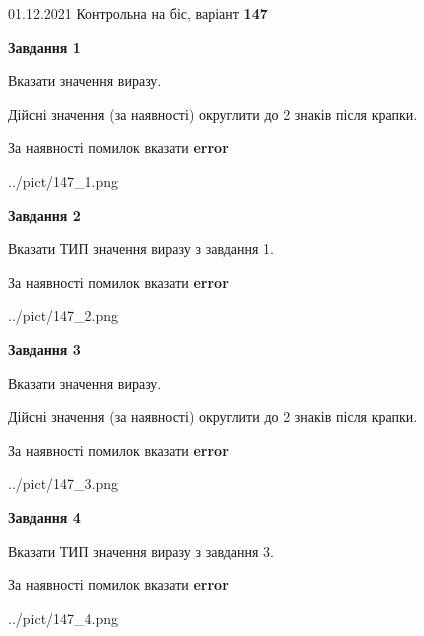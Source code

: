 \documentclass[11pt, ukrainian]{article}
\begin{document}
{01.12.2021 Контрольна на біс, варіант  \No \textbf { 147 }\par}
{
\begin {large}
{\begin {center}\textbf{Завдання 1}\end {center}}\par
Вказати значення виразу. \par
Дійсні значення (за наявності) округлити до 2 знаків після крапки. \par
За наявності помилок вказати \textbf{error}

\begin{center}
	{../pict/147_1.png}
\end{center}
\newpage

{\begin {center}\textbf{Завдання 2}\end {center}}\par
Вказати ТИП значення виразу з завдання 1. \par
За наявності помилок вказати \textbf{error}

\begin{center}
	{../pict/147_2.png}
\end{center}
\newpage

{\begin {center}\textbf{Завдання 3}\end {center}}\par
Вказати значення виразу. \par
Дійсні значення (за наявності) округлити до 2 знаків після крапки. \par
За наявності помилок вказати \textbf{error}

\begin{center}
	{../pict/147_3.png}
\end{center}
\newpage

{\begin {center}\textbf{Завдання 4}\end {center}}\par
Вказати ТИП значення виразу з завдання 3. \par
За наявності помилок вказати \textbf{error}

\begin{center}
	{../pict/147_4.png}
\end{center}
\newpage


\end{large}}
\end{document}
